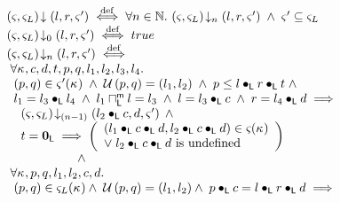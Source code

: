 \begin{definition}
%
\[
\hspace*{-0.2cm}
\begin{array}{l}
	\extendsAM{\amod{}, \amod{L}}{l}{r}{\amod{}'} \iffdef \for{n \in \Nats} \extendsAMUpto{\amod{}, \amod{L}}{n}{l}{r}{\amod{}'}  \;\land\; \amod{}' \subseteq \amod{L}\\
	
	
	\extendsAMUpto{\amod{}, \amod{L}}{0}{l}{r}{\amod{}'} \iffdef true \\ 



	\extendsAMUpto{\amod{}, \amod{L}}{n}{l}{r}{\amod{}'} \iffdef \\ 

	\hspace*{0.1cm}\for{\ca{}, c, d, t, p, q, l_1, l_2, l_3, l_4}\\
	
	\hspace*{0.2cm}(p, q) \in \amod{}'(\ca{}) 
	\;\land\; \updateFP{p, q} = (l_1, l_2)
	\;\land\; p \leq  l \composeL r \composeL t \;\land\\
	
	\hspace*{0.2cm}l_1 = l_3 \composeL l_4 
	\;\land\; l_1 \maxMeetL l = l_3 
	\;\land\; l = l_3 \composeL c 
	\;\land\; r = l_4 \composeL d \implies\\
	
	\hspace*{0.4cm} \extendsAMUpto{\amod{}, \amod{L}}{(n-1)}{l_2 \composeL c}{d}{\amod{}'} \;\land\\
	\hspace*{0.4cm}t = \unitL \implies 
	\left(
	\begin{array}{l}
		(l_1 \composeL c \composeL d, l_2 \composeL c \composeL d) \in \amod{}(\ca{})\\
		\lor\; l_2 \composeL c \composeL d \text{ is undefined} 
	\end{array}
	\right)\\
	
		\hspace*{2cm} \land\\
	

  \hspace*{0.1cm}\for{\ca{}, p, q, l_1, l_2, c, d} \\
  
  \hspace*{0.2cm} (p, q) \in \amod{L}(\ca{})
  \land\; \updateFP{p, q} = (l_1, l_2)
  \land\; p \composeL c = l \composeL r \composeL d \implies\\
  

\end{array}\]
\end{definition}
